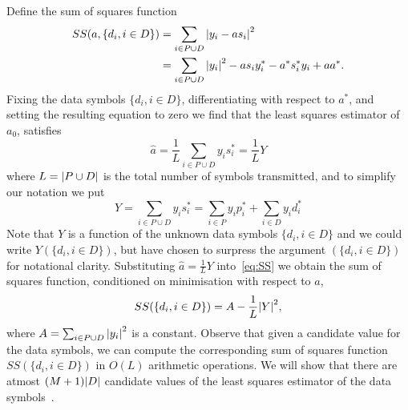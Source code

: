\documentclass[a4paper,10pt]{article}
\begin{document}
Define the sum of squares function
\begin{align}
SS(a, \{d_i, i \in D\}) &= \sum_{i \in P \cup D} {\left|  y_i - a s_i  \right|}^2 \nonumber \\
&= \sum_{i \in P \cup D} {\left| y_i \right|}^2 - a s_i y_i^* - a^* s_i^* y_i + aa^*. \label{eq:SS}
\end{align}
Fixing the data symbols $\{d_i, i \in D\}$, differentiating with respect to $a^*$, and setting the resulting equation to zero we find that the least squares estimator of $a_0$, satisfies
\begin{equation}\label{eq:hata}
\hat{a} = \frac{1}{L} \sum_{i \in P \cup D} y_i s_i^* = \frac{1}{L} Y
\end{equation}
where $L = {\left| P \cup D \right|}$ is the total number of symbols transmitted, and to simplify our notation we put 
\[
Y = \sum_{i \in P \cup D} y_i s_i^* = \sum_{i \in P } y_i p_i^* + \sum_{i \in D } y_i d_i^*
\]  
Note that $Y$ is a function of the unknown data symbols $\{ d_i, i \in D\}$ and we could write $Y(\{ d_i, i \in D\})$, but have chosen to surpress the argument $(\{ d_i, i \in D\})$ for notational clarity.  Substituting $\hat{a} = \frac{1}{L}Y$ into~\eqref{eq:SS} we obtain the sum of squares function, conditioned on minimisation with respect to $a$,
\begin{equation}\label{eq:SSdatasymbols}
SS(\{d_i, i \in D\}) = A - \frac{1}{L}{\left| Y \right|}^2,
\end{equation}
where $A = \sum_{i \in P \cup D}{\left| y_i \right|}^2$ is a constant.  Observe that given a candidate value for the data symbols, we can compute the corresponding sum of squares function $SS(\{d_i, i \in D\})$ in $O(L)$ arithmetic operations.  We will show that there are atmost $(M+1){\left| D \right|}$ candidate values of the least squares estimator of the data symbols~\cite{Sweldens2001,Mackenthun1994}.  %
\end{document}
